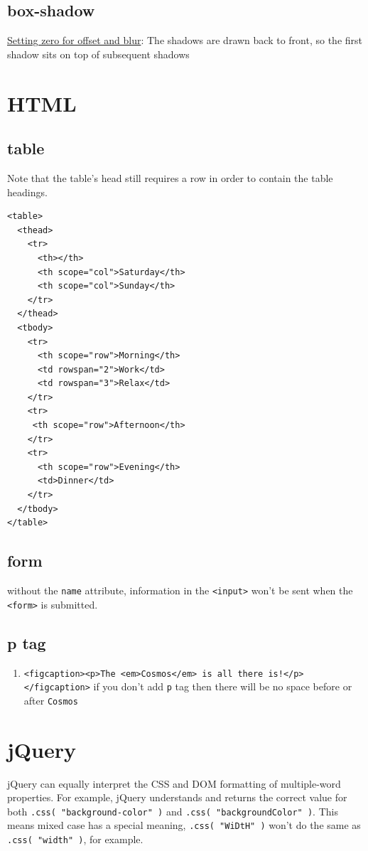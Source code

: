 \documentclass[a4paper, 12pt]{article}
\begin{document}
\subsection{box-shadow}
\href{https://developer.mozilla.org/en-US/docs/Web/CSS/box-shadow/#Setting_zero_for_offset_and_blur}{Setting zero for offset and blur}: The shadows are drawn back to front, so the first shadow sits on top of subsequent shadows


\section{HTML}
\subsection{table}
Note that the table's head still requires a row in order to contain the table headings.
\begin{verbatim}
<table>
  <thead>
    <tr>
      <th></th>
      <th scope="col">Saturday</th>
      <th scope="col">Sunday</th>
    </tr>
  </thead>
  <tbody>
    <tr>
      <th scope="row">Morning</th>
      <td rowspan="2">Work</td>
      <td rowspan="3">Relax</td>
    </tr>
    <tr>
     <th scope="row">Afternoon</th>
    </tr>
    <tr>
      <th scope="row">Evening</th>
      <td>Dinner</td>
    </tr>
  </tbody>
</table>
\end{verbatim}

\subsection{form}
without the \verb|name| attribute, information in the \verb|<input>| won't be sent when the \verb|<form>| is submitted.

\subsection{p tag}
\begin{enumerate}
\item \verb|<figcaption><p>The <em>Cosmos</em> is all there is!</p></figcaption>| if you don't add \verb|p| tag then there will be no space before or after \verb|Cosmos|
\end{enumerate}


\section{jQuery}
jQuery can equally interpret the CSS and DOM formatting of multiple-word properties. For example, jQuery understands and returns the correct value for both \verb|.css( "background-color" )| and \verb|.css( "backgroundColor" )|. This means mixed case has a special meaning, \verb|.css( "WiDtH" )| won't do the same as \verb|.css( "width" )|, for example.
\end{document}
